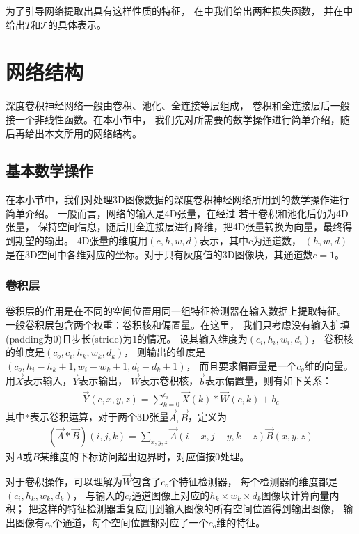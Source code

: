 为了引导网络提取出具有这样性质的特征，
在中我们给出两种损失函数，
并在中给出$T$和$\mathcal{T}$的具体表示。



\section{网络结构}
深度卷积神经网络一般由卷积、池化、全连接等层组成，
卷积和全连接层后一般接一个非线性函数。在本小节中，
我们先对所需要的数学操作进行简单介绍，随后再给出本文所用的网络结构。

\subsection{基本数学操作}
在本小节中，我们对处理3D图像数据的深度卷积神经网络所用到的数学操作进行简单介绍。
一般而言，网络的输入是4D张量，在经过 若干卷积和池化后仍为4D张量，
保持空间信息，随后用全连接层进行降维，把4D张量转换为向量，最终得到期望的输出。
4D张量的维度用$(c, h, w, d)$表示，其中$c$为通道数，
$(h, w, d)$是在3D空间中各维对应的坐标。对于只有灰度值的3D图像块，其通道数$c=1$。


\subsubsection{卷积层}
卷积层的作用是在不同的空间位置用同一组特征检测器在输入数据上提取特征。
一般卷积层包含两个权重：卷积核和偏置量。在这里，
我们只考虑没有输入扩填(padding为0)且步长(stride)为$1$的情况。
设其输入维度为$(c_i, h_i, w_i, d_i)$，
卷积核的维度是$(c_o, c_i, h_k, w_k, d_k)$，
则输出的维度是$(c_o, h_i - h_k + 1, w_i - w_k + 1, d_i - d_k + 1)$，
而且要求偏置量是一个$c_o$维的向量。用$\vec{X}$表示输入，$\vec{Y}$表示输出，
$\vec{W}$表示卷积核，$\vec{b}$表示偏置量，则有如下关系：
\begin{eqnarray}
    \vec{Y}(c, x, y, z) = \sum_{k=0}^{c_i} \vec{X}(k) * \vec{W}(c, k) + b_c
\end{eqnarray}
其中$*$表示卷积运算，对于两个3D张量$\vec{A}, \vec{B}$，定义为
\begin{eqnarray}
    (\vec{A} * \vec{B})(i, j, k) = \sum_{x, y, z}\vec{A}(i-x, j-y, k-z)
        \vec{B}(x,y,z)
\end{eqnarray}
对$A$或$B$某维度的下标访问超出边界时，对应值按$0$处理。

对于卷积操作，可以理解为$\vec{W}$包含了$c_o$个特征检测器，
每个检测器的维度都是$(c_i, h_k, w_k, d_k)$，
与输入的$c_i$通道图像上对应的$h_k \times w_k \times d_k$图像块计算向量内积；
把这样的特征检测器重复应用到输入图像的所有空间位置得到输出图像，
输出图像有$c_o$个通道，每个空间位置都对应了一个$c_o$维的特征。


